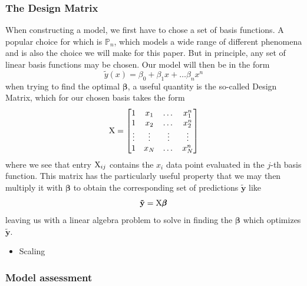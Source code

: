\documentclass[reprint, english, nofootinbib]{revtex4-2}
\begin{document}
        \subsubsection{The Design Matrix}
            \noindent
            When constructing a model, we first have to chose a set of basis functions. A popular choice for which is $\mathbb P_n$, which models a wide range of different phenomena and is also the choice we will make for this paper. But in principle, any set of linear basis functions may be chosen.
            Our model will then be in the form
            \begin{equation}
                \tilde y (x) = \beta_0 + \beta_1 x + \dots \beta_n x^n
            \end{equation}
            when trying to find the optimal $\pmb \beta$, a useful quantity is the so-called Design Matrix, which for our chosen basis takes the form
            \begin{equation}
                \textup{X} = \qty[
                \begin{matrix}
                    1 & x_1 & \dots & x_1^n \\
                    1 & x_2 & \dots & x_2^n \\
                    \vdots & \vdots & \vdots & \vdots \\
                    1 & x_N & \dots & x_N^n
                \end{matrix}
                ]
            \end{equation}
            where we see that entry $\textup{X}_{ij}$ contains the $x_i$ data point evaluated in the $j$-th basis function. This matrix has the particularly useful property that we may then multiply it with $\pmb \beta$ to obtain the corresponding set of predictions $\mathbf{\tilde y}$ like
            \begin{equation}
                \mathbf{\tilde y} = \textup{X}\pmb \beta
            \end{equation}
            leaving us with a linear algebra problem to solve in finding the $\pmb\beta$ which optimizes $\mathbf{\tilde y}$.

            \begin{itemize}
                \item Scaling
            \end{itemize}

        \subsubsection{Model assessment}
\end{document}
